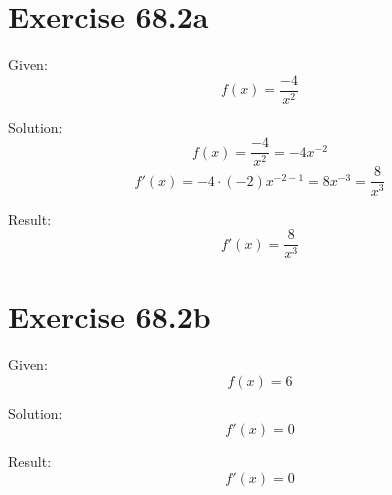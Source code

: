 \documentclass[a4paper, 10pt]{scrartcl}
\begin{document}
\section{Exercise 68.2a}

Given:
\[f(x) = \frac{-4}{x^{2}}\]

Solution:
\[f(x) = \frac{-4}{x^{2}} = -4x^{-2}\]
\[f'(x) = -4\cdot(-2)x^{-2 - 1} = 8x^{-3} = \frac{8}{x^{3}}\]

Result:
\[f'(x) = \frac{8}{x^{3}}\]

\section{Exercise 68.2b}

Given:
\[f(x) = 6\]

Solution:
\[f'(x) = 0\]

Result:
\[f'(x) = 0\]
\end{document}
